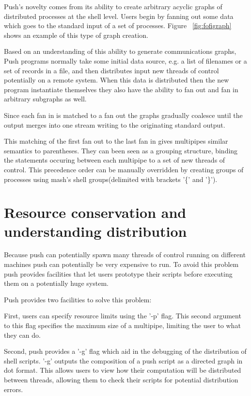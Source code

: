 \documentclass[11pt, letterpaper]{article}
\begin{document}
Push's novelty comes from its ability to create arbitrary acyclic graphs of distributed processes at the shell level. Users begin by fanning out some data which goes to the standard input of a set of processes. Figure ~\ref{fig:fofigraph} shows an example of this type of graph creation.

Based on an understanding of this ability to generate communications graphs, Push programs normally take some initial data source, e.g. a list of filenames or a set of records in a file, and then distributes input new threads of control potentially on a remote system.  When this data is distributed then the new program instantiate themselves they also have the ability to fan out and fan in arbitrary subgraphs as well. 

Since each fan in is matched to a fan out the graphs gradually coalesce until the output merges into one stream writing to the originating standard output. 

This matching of the first fan out to the last fan in gives multipipes similar semantics to parentheses. They can been seen as a grouping structure, binding the statements occuring between each multipipe to a set of new threads of control. This precedence order can be manually overridden by creating groups of processes using mash's shell groups(delimited with brackets '\{' and '\}').
\section{Resource conservation and understanding distribution}

Because push can potentially spawn many threads of control running on different machines push can potentially be very expensive to run. To avoid this problem push provides facilities that let users prototype their scripts before executing them on a potentially huge system. 

Push provides two facilities to solve this problem:

First, users can specify resource limits using the '-p' flag. This second argument to this flag specifies the maximum size of a multipipe, limiting the user to what they can do.

Second,  push provides a '-g' flag which aid in the debugging of the distribution of shell scripts. '-g' outputs the composition of a push script as a directed graph in dot\cite{koutsofios1999dgd} format. This allows users to view how their computation will be distributed between threads, allowing them to check their scripts for potential distribution errors. 
\end{document}
